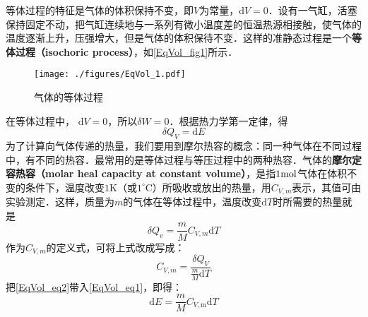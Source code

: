 

等体过程的特征是气体的体积保持不变，即$V $为常量，$\mathrm dV=0$．设有一气缸，活塞保持固定不动，把气缸连续地与一系列有微小温度差的恒温热源相接触，使气体的温度逐渐上升，压强增大，但是气体的体积保待不变．这样的准静态过程是一个\textbf{等体过程（isochoric process）}，如\autoref{EqVol_fig1}所示．
\begin{figure}[ht]
\centering
\texttt{[image: ./figures/EqVol\_1.pdf]}
\caption{气体的等体过程} \label{EqVol_fig1}
\end{figure}
在等体过程中， $\mathrm dV=0$，所以$\delta W=0$．根据热力学第一定律，得
\begin{equation} \label{EqVol_eq1}
\delta Q_{V}=\mathrm{d} E
\end{equation}
为了计算向气体传递的热量，我们要用到摩尔热容的概念：同一种气体在不同过程中，有不同的热容．最常用的是等体过程与等压过程中的两种热容．气体的\textbf{摩尔定容热容（molar heal capacity at constant volume）}，是指$1 \rm mol$气体在体积不变的条件下，温度改变$1\mathrm{K}$（或$1^\circ \mathrm{C}$）所吸收或放出的热量，用$C_{V,m}$表示，其值可由实验测定．这样，质量为$m $的气体在等体过程中，温度改变$\mathrm dT $时所需要的热量就是
\begin{equation} \label{EqVol_eq2}
\delta Q_{v}=\frac{m}{M} C_{V, {m}} \mathrm{d} T
\end{equation}
作为$C_{V,m}$的定义式，可将上式改成写成：
\begin{equation} 
C_{V, m}=\frac{\delta Q_{V}}{\frac{m}{M} \mathrm{d} T}
\end{equation}
把\autoref{EqVol_eq2}带入\autoref{EqVol_eq1}，即得：
\begin{equation}
\mathrm{d} E=\frac{m}{M} C_{V, \mathrm{m}} \mathrm{d} T
\end{equation}